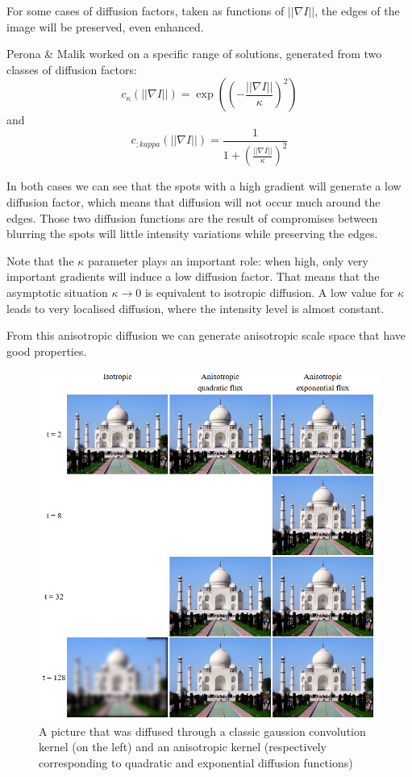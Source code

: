 \documentclass[12pt,a4paper]{book}
\begin{document}
For some cases of diffusion factors, taken as functions of $|| \nabla I ||$, the edges of the image will be preserved, even enhanced.

Perona \& Malik worked on a specific range of solutions, generated from two classes of diffusion factors:
\begin{equation}
	c_{\kappa}(||\nabla I||) = \exp((-\frac{||\nabla I||}{\kappa})^{2})
\end{equation}
and
\begin{equation}
c_{;kappa}(||\nabla I||) = \frac{1}{1+(\frac{|| \nabla I ||}{\kappa})^{2}}
\end{equation}

In both cases we can see that the spots with a high gradient will generate a low diffusion factor, which means that diffusion will not occur much around the edges. Those two diffusion functions are the result of compromises between blurring the spots will little intensity variations while preserving the edges.

Note that the $\kappa$ parameter plays an important role: when high, only very important gradients will induce a low diffusion factor. That means that the asymptotic situation $\kappa \to 0$ is equivalent to isotropic diffusion. A low value for $\kappa$ leads to very localised diffusion, where the intensity level is almost constant.

From this anisotropic diffusion we can generate anisotropic scale space that have good properties.

\begin{figure}
	\caption{A picture that was diffused through a classic gaussion convolution kernel (on the left) and an anisotropic kernel (respectively corresponding to quadratic and exponential diffusion functions)}
	\includegraphics{Anisotropic_Diffusion_Comp.png}
\end{figure}
\end{document}
